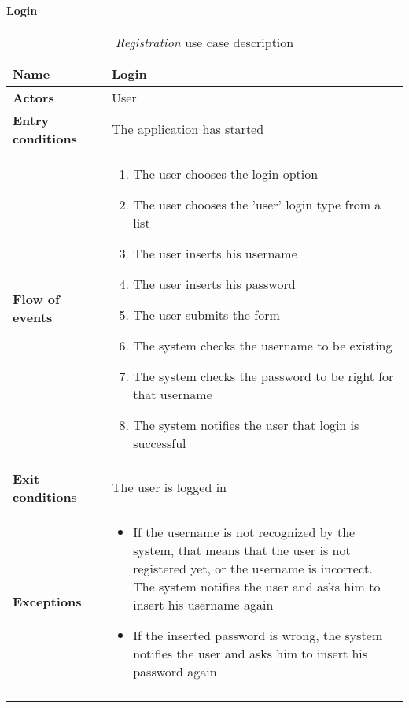 		\paragraph{Login}
		\begin{longtable}{p{0.25\linewidth}p{0.75\linewidth}}
			\toprule
			\textbf{Name} & \textbf{Login} \\
			\midrule
			\textbf{Actors} & User \\
			\midrule
			\textbf{Entry conditions} & The application has started \\
			\midrule
			\textbf{Flow of events} & 
			\begin{enumerate}
				\item The user chooses the login option
				\item The user chooses the 'user' login type from a list
				\item The user inserts his username
				\item The user inserts his password
				\item The user submits the form
				\item The system checks the username to be existing
				\item The system checks the password to be right for that username
				\item The system notifies the user that login is successful
			\end{enumerate} \\
			\midrule
			\textbf{Exit conditions} & The user is logged in\\
			\midrule
			\textbf{Exceptions} & 
			\begin{itemize}
				\item If the username is not recognized by the system, that means that the user is not registered yet, or the username is incorrect. The system notifies the user and asks him to insert his username again
				\item If the inserted password is wrong, the system notifies the user and asks him to insert his password again			
			\end{itemize} \\
			\bottomrule
			\caption{\emph{Registration} use case description}
		\end{longtable}
	
